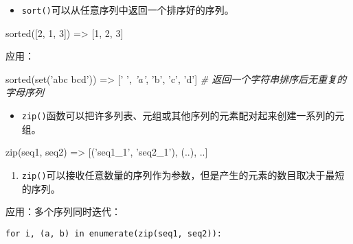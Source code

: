 \documentclass[]{ctexart}
\newenvironment{Shaded}{}{}
\newcommand{\DecValTok}[1]{\textcolor[rgb]{0.25,0.63,0.44}{{#1}}}
\newcommand{\StringTok}[1]{\textcolor[rgb]{0.25,0.44,0.63}{{#1}}}
\newcommand{\CommentTok}[1]{\textcolor[rgb]{0.38,0.63,0.69}{\textit{{#1}}}}
\newcommand{\OperatorTok}[1]{\textcolor[rgb]{0.40,0.40,0.40}{{#1}}}
\newcommand{\BuiltInTok}[1]{{#1}}
\newcommand{\NormalTok}[1]{{#1}}
\begin{document}
\begin{itemize}
\item
  \texttt{sort()}可以从任意序列中返回一个排序好的序列。
\end{itemize}

\begin{Shaded}
\begin{Highlighting}[]
\BuiltInTok{sorted}\NormalTok{([}\DecValTok{2}\NormalTok{, }\DecValTok{1}\NormalTok{, }\DecValTok{3}\NormalTok{]) }\OperatorTok{=>} \NormalTok{[}\DecValTok{1}\NormalTok{, }\DecValTok{2}\NormalTok{, }\DecValTok{3}\NormalTok{]}
\end{Highlighting}
\end{Shaded}

应用：

\begin{Shaded}
\begin{Highlighting}[]
\BuiltInTok{sorted}\NormalTok{(}\BuiltInTok{set}\NormalTok{(}\StringTok{'abc bcd'}\NormalTok{)) }\OperatorTok{=>} \NormalTok{[}\StringTok{' '}\NormalTok{,}
\CommentTok{'a'}\NormalTok{, }\StringTok{'b'}\NormalTok{, }\StringTok{'c'}\NormalTok{, }\StringTok{'d'}\NormalTok{]}
\CommentTok{# 返回一个字符串排序后无重复的字母序列}
\end{Highlighting}
\end{Shaded}

\begin{itemize}
\item
  \texttt{zip()}函数可以把许多列表、元组或其他序列的元素配对起来创建一系列的元组。
\end{itemize}

\begin{Shaded}
\begin{Highlighting}[]
\BuiltInTok{zip}\NormalTok{(seq1, seq2) }\OperatorTok{=>} \NormalTok{[(}\StringTok{'seq1_1'}\NormalTok{, }\StringTok{'seq2_1'}\NormalTok{), (..), ..]}
\end{Highlighting}
\end{Shaded}

\begin{enumerate}
\def\labelenumi{\arabic{enumi}.}
\item
  \texttt{zip()}可以接收任意数量的序列作为参数，但是产生的元素的数目取决于最短的序列。
\end{enumerate}

应用：多个序列同时迭代：

\begin{verbatim}
for i, (a, b) in enumerate(zip(seq1, seq2)):
\end{verbatim}
\end{document}

